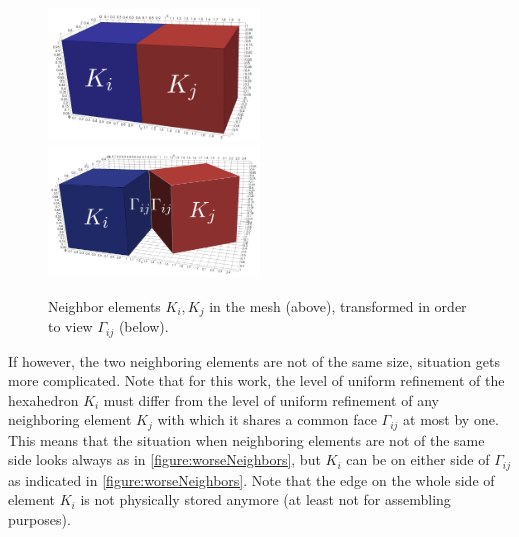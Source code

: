 \begin{figure}[H]
		\begin{center}
			\includegraphics[width=0.5\textwidth]{img/mesh/neighborsK.jpg}
			\vspace{3mm}
			\includegraphics[width=0.5\textwidth]{img/mesh/neighborsSepK.jpg}
			\vspace{-5mm}
		\caption{Neighbor elements $K_i, K_j$ in the mesh (above), transformed in order to view $\Gamma_{ij}$ (below).}
		\label{figure:simpleNeighbors}
		\end{center}
	\end{figure}\vspace{-5mm}
	
If however, the two neighboring elements are not of the same size, situation gets more complicated. Note that for this work, the level of uniform refinement of the hexahedron $K_i$ must differ from the level of uniform refinement of any neighboring element $K_j$ with which it shares a common face $\Gamma_{ij}$ at most by one. This means that the situation when neighboring elements are not of the same side looks always as in \cref{figure:worseNeighbors}, but $K_i$ can be on either side of $\Gamma_{ij}$ as indicated in \cref{figure:worseNeighbors}. Note that the edge on the whole side of element $K_i$ is not physically stored anymore (at least not for assembling purposes).

